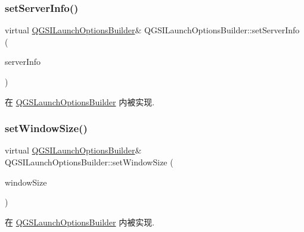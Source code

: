 \subsubsection{\texorpdfstring{set\+Server\+Info()}{setServerInfo()}}
{\footnotesize\ttfamily virtual \mbox{\hyperlink{class_q_g_s_i_launch_options_builder}{Q\+G\+S\+I\+Launch\+Options\+Builder}}\& Q\+G\+S\+I\+Launch\+Options\+Builder\+::set\+Server\+Info (\begin{DoxyParamCaption}\item[{const \mbox{\hyperlink{class_q_g_s_server_info}{Q\+G\+S\+Server\+Info}} \&}]{server\+Info }\end{DoxyParamCaption})\hspace{0.3cm}{\ttfamily [pure virtual]}}



在 \mbox{\hyperlink{class_q_g_s_launch_options_builder_a3403f2bb452763be236c8dd21bcb6f4c}{Q\+G\+S\+Launch\+Options\+Builder}} 内被实现.

\mbox{\label{class_q_g_s_i_launch_options_builder_a9ae589d52294839563a4c4b48ecf59da}} 
\subsubsection{\texorpdfstring{set\+Window\+Size()}{setWindowSize()}}
{\footnotesize\ttfamily virtual \mbox{\hyperlink{class_q_g_s_i_launch_options_builder}{Q\+G\+S\+I\+Launch\+Options\+Builder}}\& Q\+G\+S\+I\+Launch\+Options\+Builder\+::set\+Window\+Size (\begin{DoxyParamCaption}\item[{const Q\+Size \&}]{window\+Size }\end{DoxyParamCaption})\hspace{0.3cm}{\ttfamily [pure virtual]}}



在 \mbox{\hyperlink{class_q_g_s_launch_options_builder_a4c7d32950b863301370a8547c2562dfd}{Q\+G\+S\+Launch\+Options\+Builder}} 内被实现.

\mbox{\label{class_q_g_s_i_launch_options_builder_aa789a60c4b15f5ba900046eed709de2f}} 
